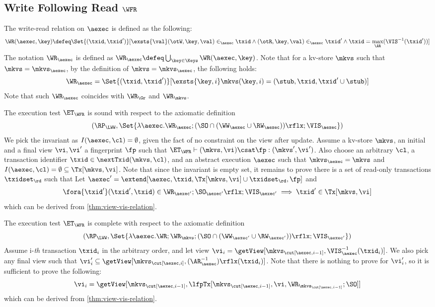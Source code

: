 \subsection{Write Following Read \( \WFR \) }
\label{sec:sound-complete-wfr}

The write-read relation  on \( \aexec \) is defined as the following:
\[
    \WR(\aexec, \key) \defeq \Set{ (\txid, \txid') }[ \exsts{\val} (\otW, \key, \val) \in_\aexec \txid \land (\otR, \key, \val) \in_\aexec \txid' \land \txid = \max_\AR(\VIS^{-1}(\txid')) ]
\]
The notation \( \WR_\aexec \) is defined as \( \WR_\aexec \defeq \bigcup_{\key \in \Keys} \WR(\aexec, \key) \).
Note that for a kv-store \( \mkvs \) such that \( \mkvs = \mkvs_\aexec \),
by the definition of  \(  \mkvs = \mkvs_\aexec \), 
the following holds:
\[
    \WR_\aexec = \Set{(\txid, \txid')}[\exsts{\key, i } \mkvs(\key, i) = (\stub, \txid, \txid'\cup \stub)]
\]
Note that such \( \WR_\aexec \) coincides with \( \WR_\Gr \) and \( \WR_\mkvs \).

The execution test $\ET_\WFR$ is sound with respect to the axiomatic definition \cite{surech-session-guarantee}
\[ (\RP_{\LWW}, \Set{\lambda \aexec. \WR_\aexec ; (\SO \cap (\WW_{\aexec} \cup \RW_{\aexec}) )\rflx ; \VIS_{\aexec} })\]
We pick the invariant as \( I( \aexec, \cl ) = \emptyset \), given the fact of no constraint on the view after update.
Assume a kv-store $\mkvs$, an initial and a final view $\vi, \vi'$  a fingerprint $\fp$ 
such that $\ET_{\WFR} \vdash (\mkvs, \vi) \csat \fp: (\mkvs', \vi')$. 
Also choose an arbitrary $\cl$, a transaction identifier $\txid \in \nextTxid(\mkvs, \cl)$, 
and an abstract execution $\aexec$ such that $\mkvs_{\aexec} = \mkvs$ and 
\( I(\aexec, \cl) =  \emptyset \subseteq \Tx[\mkvs, \vi] \).
Note that since the invariant is empty set, it remains to prove there is a set of read-only transactions \( \txidset_\rd \) such that
Let \( \aexec' = \extend[\aexec, \txid, \Tx[\mkvs, \vi] \cup \txidset_\rd, \fp] \) and
\[
    \begin{array}{@{}l@{}}
        \fora{ \txid' } 
        (\txid' ,\txid)  \in \WR_{\aexec'} ; \SO_{\aexec'}\rflx ; \VIS_{\aexec'} 
        \implies \txid' \in \Tx[\mkvs, \vi]
    \end{array}
\]
which can be derived from \cref{thm:view-vis-relation}.

The execution test $\ET_\WFR$ is complete with respect to the axiomatic definition 
\[ (\RP_{\LWW}, \Set{\lambda \aexec. \WR ; \WR_{\mkvs} ; (\SO \cap (\WW_{\aexec'} \cup \RW_{\aexec'}) )\rflx ; \VIS_{\aexec'} })\]
Assume i-\emph{th} transaction \( \txid_i \) in the arbitrary order,
and let view \( \vi_{i} = \getView[\mkvs_{\cut[\aexec, i-1]}, \VIS^{-1}_{\aexec}(\txid_{i})] \).
We also pick any final view such that \( \vi'_{i} \subseteq \getView[\mkvs_{\cut[\aexec, i]}, (\AR^{-1}_{\aexec})\rflx(\txid_{i})] \).
Note that there is nothing to prove for \( \vi'_i \),
so it is sufficient to prove the following:
\[
    \vi_i = \getView[\mkvs_{\cut[\aexec, i-1]}, \lfpTx[\mkvs_{\cut[\aexec, i-1]},\vi,\WR_{\mkvs_{\cut[\aexec, i-1]}}; \SO]]
\]
which can be derived from \cref{thm:view-vis-relation}.
